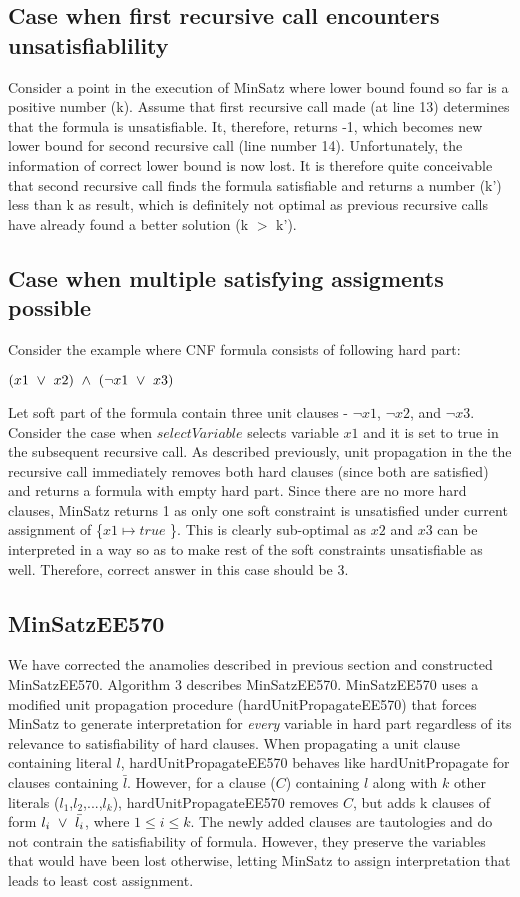 \subsection {Case when first recursive call encounters unsatisfiablility}
Consider a point in the execution of MinSatz where lower bound found so far is a
positive number (k). Assume that first recursive call made (at line 13)
determines that the formula is unsatisfiable. It, therefore, returns -1, which
becomes new lower bound for second recursive call (line number 14).
Unfortunately, the information of correct lower bound is now lost. It is
therefore quite conceivable that second recursive call finds the formula
satisfiable and returns a number (k') less than k as result, which is definitely
not optimal as previous recursive calls have already found a better solution (k
$>$ k').

\subsection {Case when multiple satisfying assigments possible}
Consider the example where CNF formula consists of following hard part:
\begin{center}
  \(
    (x1 ~\vee~ x2) ~\wedge~ (\neg x1 ~\vee~ x3) 
  \)
\end{center}
Let soft part of the formula contain three unit clauses - $\neg x1$, $\neg x2$,
and $\neg x3$. Consider the case when $selectVariable$ selects variable $x1$ and
it is set to true in the subsequent recursive call. As described previously,
unit propagation in the the recursive call immediately removes both hard clauses
(since both are satisfied) and returns a formula with empty hard part. Since
there are no more hard clauses, MinSatz returns 1 as only one soft constraint is
unsatisfied under current assignment of \{$x1 \mapsto true$ \}. This is clearly
sub-optimal as $x2$ and $x3$ can be interpreted in a way so as to make rest of
the soft constraints unsatisfiable as well. Therefore, correct answer in this
case should be 3.

\subsection {MinSatzEE570}
We have corrected the anamolies described in previous section and constructed
MinSatzEE570. Algorithm 3 describes MinSatzEE570. MinSatzEE570 uses a modified
unit propagation procedure (hardUnitPropagateEE570) that forces MinSatz to
generate interpretation for \emph{every} variable in hard part regardless of its
relevance to satisfiability of hard clauses. When propagating a unit clause
containing literal $l$, hardUnitPropagateEE570 behaves like hardUnitPropagate
for clauses containing $\bar{l}$. However, for a clause ($C$) containing $l$
along with $k$ other literals ($l_1$,$l_2$,...,$l_k$), hardUnitPropagateEE570
removes $C$, but adds k clauses of form $l_i ~\vee~ \bar{l_i}$, where $1\le i \le
k$. The newly added clauses are tautologies and do not contrain the
satisfiability of formula.  However, they preserve the variables that would have
been lost otherwise, letting MinSatz to assign interpretation that leads to
least cost assignment.

